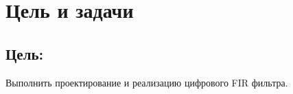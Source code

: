 \chapter*{Цель и задачи}
\label{ch:intro}

\section*{\textbf{Цель:}}

Выполнить проектирование и реализацию цифрового FIR фильтра.

\endinput